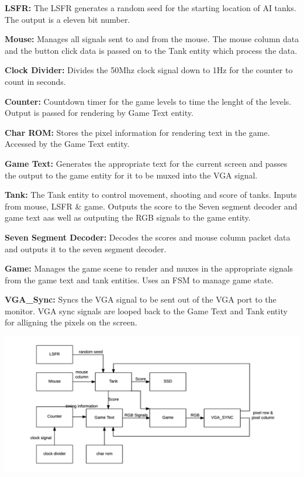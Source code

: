 \documentclass[a4paper,10pt,twoside]{article}
\begin{document}
\quad\:\:\:\textbf{LSFR:} The LSFR generates a random seed for the starting location of AI tanks. The output is a eleven bit number.

\textbf{Mouse:} Manages all signals sent to and from the mouse. The mouse column data and the button click data is passed on to the Tank entity which process the data.

\textbf{Clock Divider:} Divides the 50Mhz clock signal down to 1Hz for the counter to count in seconds.

\textbf{Counter:} Countdown timer for the game levels to time the lenght of the levels. Output is passed for rendering by Game Text entity.

\textbf{Char ROM:} Stores the pixel information for rendering text in the game. Accessed by the Game Text entity.

\textbf{Game Text:} Generates the appropriate text for the current screen and passes the output to the game entity for it to be muxed into the VGA signal.

\textbf{Tank:} The Tank entity to control movement, shooting and score of tanks. Inputs from mouse, LSFR \& game. Outputs the score to the Seven segment decoder and game text aas well as outputing the RGB signals to the game entity.

\textbf{Seven Segment Decoder:} Decodes the scores and mouse column packet data and outputs it to the seven segment decoder.

\textbf{Game:} Manages the game scene to render and muxes in the appropriate signals from the game text and tank entities. Uses an FSM to manage game state.

\textbf{VGA\_Sync:} Syncs the VGA signal to be sent out of the VGA port to the monitor. VGA sync signals are looped back to the Game Text and Tank entity for alligning the pixels on the screen.

\includegraphics[width=1\textwidth]{block_diagram.png}
\end{document}
